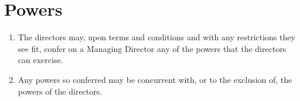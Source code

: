 \section{Powers}

\begin{enumerate}[label=(\alph*)]
    \item The directors may, upon terms and conditions and with any restrictions they see fit, confer on a Managing Director any of the powers that the directors can exercise.
    
    \item Any powers so conferred may be concurrent with, or to the exclusion of, the powers of the directors.
\end{enumerate} 